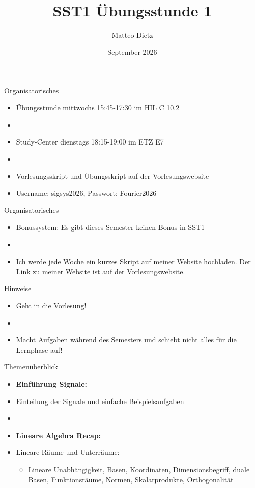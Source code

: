 \documentclass[14pt, aspectratio=169, handout]{beamer}
\title{SST1 Übungsstunde 1}
\author{Matteo Dietz}
\date{September 2026}
\begin{document}
\maketitle

\begin{frame}{Organisatorisches}
    \begin{itemize}
        \item Übungsstunde mittwochs 15:45-17:30 im HIL C 10.2
        \item[]
        \item Study-Center dienstags 18:15-19:00 im ETZ E7
        \item[]
        \item Vorlesungsskript und Übungsskript auf der Vorlesungswebsite
        \item[] Username: sigsys2026, \hspace{10pt} Passwort: Fourier2026
    \end{itemize}
\end{frame}

\begin{frame}{Organisatorisches}
    \begin{itemize}
        \item Bonussystem: Es gibt dieses Semester keinen Bonus in SST1
        \item[] 
        \item Ich werde jede Woche ein kurzes Skript auf meiner Website hochladen. Der Link zu meiner Website ist auf der Vorlesungswebsite.
    \end{itemize}
\end{frame}

\begin{frame}{Hinweise}
\begin{itemize}
    \item \alert{Geht in die Vorlesung!}
    \item[] 
    \item \alert{Macht Aufgaben während des Semesters und schiebt nicht alles für die Lernphase auf!}
\end{itemize}
\end{frame}

\begin{frame}{Themenüberblick}
    \begin{itemize}
    \item \textbf{Einführung Signale:}
    \item[] Einteilung der Signale und einfache Beispielsaufgaben
    \item[] 
    \item \textbf{Lineare Algebra Recap:}
    \item[] Lineare Räume und Unterräume: \begin{itemize}
        \item[] Lineare Unabhängigkeit, Basen, Koordinaten, Dimensionsbegriff, duale Basen, Funktionsräume, Normen, Skalarprodukte, Orthogonalität
    \end{itemize}
\end{itemize}
\end{frame}
\end{document}
